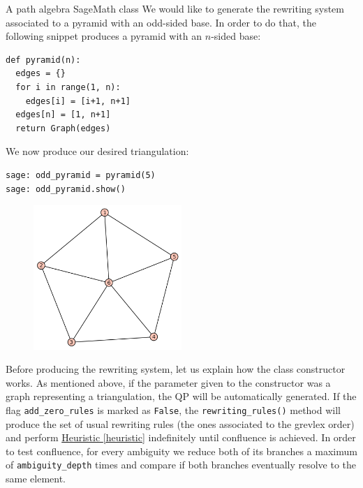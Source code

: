 \begin{chapter}{A path algebra SageMath class}
We would like to generate the rewriting system associated to a pyramid with an odd-sided base. In order to do that, the following snippet produces a pyramid with an $n$-sided base:
\begin{lstlisting}
def pyramid(n):
  edges = {}
  for i in range(1, n):
    edges[i] = [i+1, n+1]
  edges[n] = [1, n+1]
  return Graph(edges)
\end{lstlisting}
We now produce our desired triangulation:
\begin{lstlisting}
sage: odd_pyramid = pyramid(5)
sage: odd_pyramid.show()
\end{lstlisting}
\begin{figure}[h]
\centering
\includegraphics[width=0.5\textwidth]{odd_pyramid.png}
\end{figure}
Before producing the rewriting system, let us explain how the class constructor works. As mentioned above, if the parameter given to the constructor was a graph representing a triangulation, the QP will be automatically generated. If the flag \texttt{add\_zero\_rules} is marked as \texttt{False}, the \texttt{rewriting\_rules()} method will produce the set of usual rewriting rules (the ones associated to the grevlex order) and perform \hyperref[heuristic]{Heuristic \ref*{heuristic}} indefinitely until confluence is achieved. In order to test confluence, for every ambiguity we reduce both of its branches a maximum of \texttt{ambiguity\_depth} times and compare if both branches eventually resolve to the same element.


\end{chapter}
